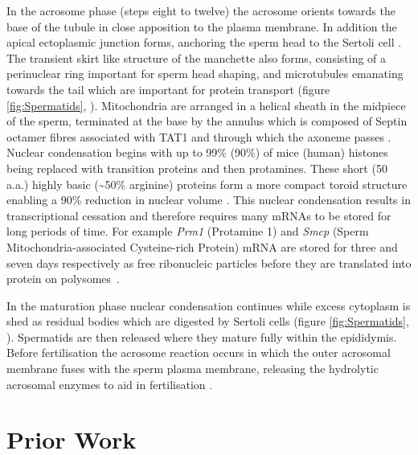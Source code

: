 In the acrosome phase (steps eight to twelve) the acrosome orients towards the base of the tubule in close apposition to the plasma membrane.
In addition the apical ectoplasmic junction forms, anchoring the sperm head to the Sertoli cell \parencite{Wong2008Biology}.
The transient skirt like structure of the manchette also forms, consisting of a perinuclear ring important for sperm head shaping, and microtubules emanating towards the tail which are important for protein transport (figure \ref{fig:Spermatids}, \cite{Lehti2016Formation}).
Mitochondria are arranged in a helical sheath in the midpiece of the sperm, terminated at the base by the annulus which is composed of Septin octamer fibres associated with TAT1 and through which the axoneme passes \parencite{Ho2007Three, Toure2011Septins, Kuo2015SEPT12}.
Nuclear condensation begins with up to 99\% (90\%) of mice (human) histones being replaced with transition proteins and then protamines.
These short (50 a.a.) highly basic (\textasciitilde50\% arginine) proteins form a more compact toroid structure enabling a 90\% reduction in nuclear volume \parencite{Balhorn2007protamine, Ward2010Function, Yamaguchi2018Reevaluating}.
This nuclear condensation results in transcriptional cessation and therefore requires many mRNAs to be stored for long periods of time.
For example \textit{Prm1} (Protamine 1) and \textit{Smcp} (Sperm Mitochondria-associated Cysteine-rich Protein) mRNA are stored for three and seven days respectively as free ribonucleic particles before they are translated into protein on polysomes~\parencite{Cullinane2015Mechanisms, Kleene1984Translational, Kleene2004Patterns}.

In the maturation phase nuclear condensation continues while excess cytoplasm is shed as residual bodies which are digested by Sertoli cells (figure \ref{fig:Spermatids}, \cite{Lacy1962CERTAIN, Breucker1985Morphogenesis, Hermo2010Surfing}).
Spermatids are then released where they mature fully within the epididymis.
Before fertilisation the acrosome reaction occurs in which the outer acrosomal membrane fuses with the sperm plasma membrane, releasing the hydrolytic acrosomal enzymes to aid in fertilisation \parencite{Jin2011Most}.






\section{Prior Work}

